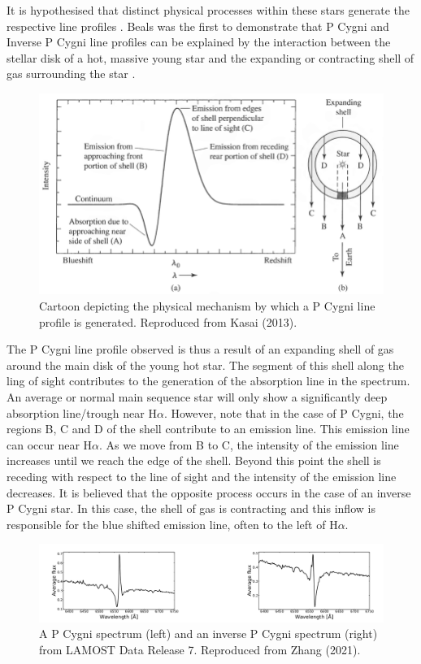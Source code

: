 It is hypothesised that distinct physical processes within these stars generate the respective line profiles \cite{hou2016catalog}. Beals was the first to demonstrate that P Cygni and Inverse P Cygni line profiles can be explained by the interaction between the stellar disk of a hot, massive young star and the expanding or contracting shell of gas surrounding the star \cite{1953PDAO....9....1B}. 

\begin{figure}[h]
\centering
\includegraphics[scale=.40]{figures/expandingpcygni.png}
\caption{Cartoon depicting the physical mechanism by which a P Cygni line profile is generated. Reproduced from Kasai (2013)\cite{kasai2013type}.}
\end{figure}

The P Cygni line profile observed is thus a result of an expanding shell of gas around the main disk of the young hot star. The segment of this shell along the ling of sight contributes to the generation of the absorption line in the spectrum. An average or normal main sequence star will only show a significantly deep absorption line/trough near H$\alpha$. However, note that in the case of P Cygni, the regions B, C and D of the shell contribute to an emission line. This emission line can occur near H$\alpha$. As we move from B to C, the intensity of the emission line increases until we reach the edge of the shell. Beyond this point the shell is receding with respect to the line of sight and the intensity of the emission line decreases. It is believed that the opposite process occurs in the case of an inverse P Cygni star. In this case, the shell of gas is contracting and this inflow is responsible for the blue shifted emission line, often to the left of H$\alpha$.

\begin{figure}[h]
\centering
\includegraphics[scale=.50]{figures/p cygni and inverse p cygni.png}
\caption{A P Cygni spectrum (left) and an inverse P Cygni spectrum (right) from LAMOST Data Release 7. Reproduced from Zhang (2021)\cite{zhang2021catalog}.}
\end{figure}

